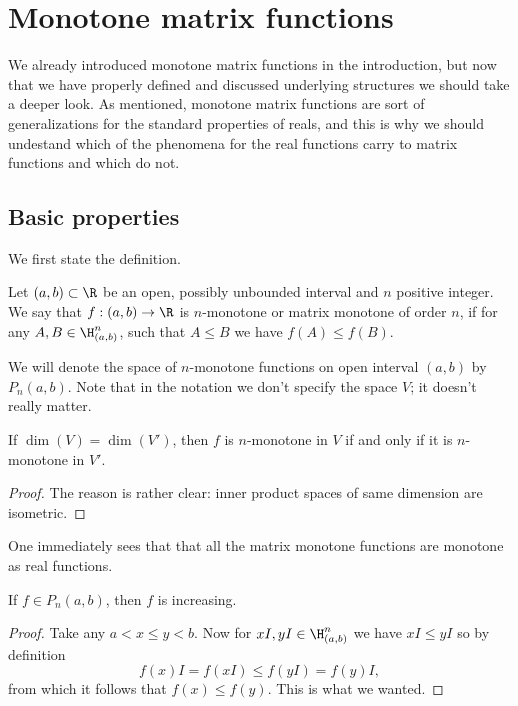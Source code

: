\chapter{Monotone matrix functions}

We already introduced monotone matrix functions in the introduction, but now that we have properly defined and discussed underlying structures we should take a deeper look. As mentioned, monotone matrix functions are sort of generalizations for the standard properties of reals, and this is why we should undestand which of the phenomena for the real functions carry to matrix functions and which do not.

\section{Basic properties}

We first state the definition.

\begin{maar}
	Let $(a,b) \subset \R$ be an open, possibly unbounded interval and $n$ positive integer. We say that $f : (a, b) \to \R$ is $n$-monotone or matrix monotone of order $n$, if for any $A, B \in \H^{n}_{(a, b)}$, such that $A \leq B$ we have $f(A) \leq f(B)$.
\end{maar}

We will denote the space of $n$-monotone functions on open interval $(a, b)$ by $P_{n}(a, b)$. Note that in the notation we don't specify the space $V$; it doesn't really matter.

\begin{prop}
	If $\dim(V) = \dim(V')$, then $f$ is $n$-monotone in $V$ if and only if it is $n$-monotone in $V'$.
\end{prop}
\begin{proof}
	The reason is rather clear: inner product spaces of same dimension are isometric.
\end{proof}

One immediately sees that that all the matrix monotone functions are monotone as real functions.

\begin{prop}
	If $f \in P_{n}(a, b)$, then $f$ is increasing.
\end{prop}
\begin{proof}
	Take any $a < x \leq y < b$. Now for $xI, yI \in \H^{n}_{(a, b)}$ we have $x I \leq y I$ so by definition
	\[
		f(x) I = f(xI) \leq f(y I) = f(y) I,
	\]
	from which it follows that $f(x) \leq f(y)$. This is what we wanted.
\end{proof}

